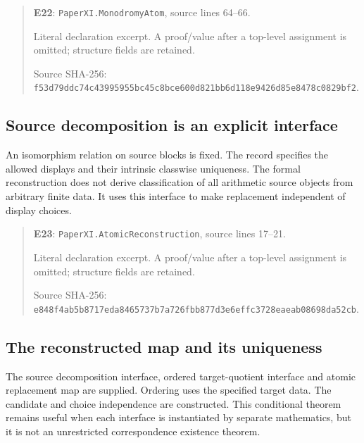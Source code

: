 \documentclass[10pt,oneside]{book}
\begin{document}
\begin{quote}\footnotesize\textbf{E22}: \nolinkurl{PaperXI.MonodromyAtom}, source lines 64--66.\par Literal declaration excerpt. A proof/value after a top-level assignment is omitted; structure fields are retained.\par Source SHA-256: {\scriptsize\texttt{f53d79ddc74c43995955bc45c8bce600d821bb6d118e9426d85e8478c0829bf2}}.\end{quote}


\subsection{Source decomposition is an explicit interface}
\label{guide:E23}
An isomorphism relation on source blocks is fixed. The record specifies the allowed displays and their intrinsic classwise uniqueness.
The formal reconstruction does not derive classification of all arithmetic source objects from arbitrary finite data. It uses this interface to make replacement independent of display choices.

\begin{quote}\footnotesize\textbf{E23}: \nolinkurl{PaperXI.AtomicReconstruction}, source lines 17--21.\par Literal declaration excerpt. A proof/value after a top-level assignment is omitted; structure fields are retained.\par Source SHA-256: {\scriptsize\texttt{e848f4ab5b8717eda8465737b7a726fbb877d3e6effc3728eaeab08698da52cb}}.\end{quote}


\subsection{The reconstructed map and its uniqueness}
\label{guide:E24}
The source decomposition interface, ordered target-quotient interface and atomic replacement map are supplied. Ordering uses the specified target data.
The candidate and choice independence are constructed. This conditional theorem remains useful when each interface is instantiated by separate mathematics, but it is not an unrestricted correspondence existence theorem.
\end{document}
